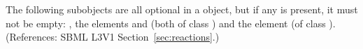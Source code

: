 The following subobjects are all optional in a \Reaction object, but if any
is present, it must not be empty: \KineticLaw, the elements
 and  (both of class
\ListOfSpeciesReferences) and the element  (of class
\ListOfModifierSpeciesReferences).  (References: SBML L3V1
Section~\ref{sec:reactions}.)
